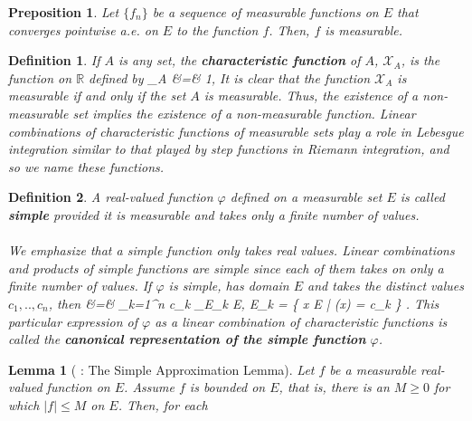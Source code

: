 \documentclass{article} %
\def\eQb#1\eQe{\begin{eqnarray*}#1\end{eqnarray*}}
\theoremstyle{quest}
\newtheorem*{definition}{Definition}
\newtheorem*{lemma}{Lemma}
\newtheorem*{preposition}{Preposition}
\begin{document}
\bigskip

\begin{preposition}
Let $\{ f_n \} $ be a sequence of measurable functions on $E$ that converges pointwise 
a.e. on $E$ to the function $f$. Then, $f$ is measurable.
\end{preposition}

\bigskip

\begin{definition}
If $A$ is any set, the \textbf{characteristic function} of $A$, $\mathcal{X}_{A}$,
is the function on $\mathbb{R}$ defined by 
\eQb
\mathcal{X}_{A} &=& 1,
\eQe
It is clear that the function $\mathcal{X}_{A}$ is measurable if and only if the set $A$
is measurable. Thus, the existence of a non-measurable set implies the existence of
a non-measurable function. Linear combinations of characteristic functions of measurable sets
play a role in Lebesgue integration similar to that played by step functions in Riemann
integration, and so we name these functions.
\end{definition}

\bigskip

\begin{definition}
A real-valued function $\varphi$ defined on a measurable set $E$ is called \textbf{simple} 
provided it is measurable and takes only a finite number of values. \\
\\
We emphasize that a simple function only takes real values. Linear combinations and
products of simple functions are simple since each of them takes on only a finite
number of values. If $\varphi$ is simple, has domain $E$ and takes the distinct values
$c_1, .., c_n$, then 
\eQb
\varphi &=& \sum_{k=1}^{n} c_k \cdot {}_{E_k} \>  \> E, 
\>  \> E_k = \{ x \in E | \varphi(x) = c_k \} .
\eQe
This particular expression of $\varphi$ as a linear combination of characteristic functions
is called the \textbf{canonical representation of the simple function} $\varphi$.
\end{definition}

\bigskip

\begin{lemma}[ : The Simple Approximation Lemma]
Let $f$ be a measurable real-valued function on $E$. Assume $f$ is bounded on $E$,
that is, there is an $M \geq 0$ for which $|f| \leq M$ on $E$. Then, for each

\end{lemma}
\end{document}

